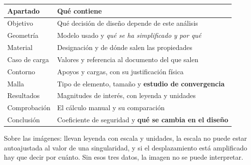 \begin{center}
\begin{tabularx}{\textwidth}{@{}lX@{}}
\toprule
\textbf{Apartado} & \textbf{Qué contiene} \\
\midrule
Objetivo & Qué decisión de diseño depende de este análisis \\
Geometría & Modelo usado y \emph{qué se ha simplificado y por qué} \\
Material & Designación y de dónde salen las propiedades \\
Caso de carga & Valores y referencia al documento del que salen \\
Contorno & Apoyos y cargas, con su justificación física \\
Malla & Tipo de elemento, tamaño y \textbf{estudio de convergencia} \\
Resultados & Magnitudes de interés, con leyenda y unidades \\
Comprobación & El cálculo manual y su comparación \\
Conclusión & Coeficiente de seguridad y \textbf{qué se cambia en el diseño} \\
\bottomrule
\end{tabularx}
\end{center}

Sobre las imágenes: llevan leyenda con escala y unidades, la escala no puede estar
autoajustada al valor de una singularidad, y si el desplazamiento está amplificado
hay que decir por cuánto. Sin esos tres datos, la imagen no se puede interpretar.


